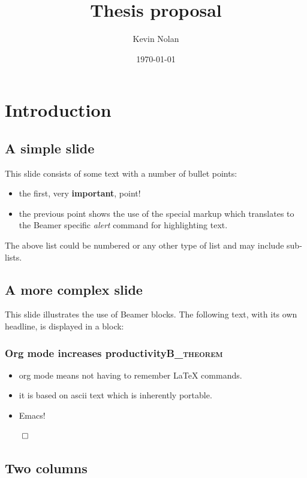 \documentclass[bigger]{beamer}
\author{Kevin Nolan}
\date{\today}
\title{Thesis proposal}
\begin{document}
\maketitle
\tableofcontents



\section{Introduction}
\label{sec:org74a5974}
\subsection{A simple slide}
\label{sec:orga8d710e}
This slide consists of some text with a number of bullet points:

\begin{itemize}
\item the first, very \textbf{important}, point!
\item the previous point shows the use of the special markup which
translates to the Beamer specific \emph{alert} command for highlighting
text.
\end{itemize}


The above list could be numbered or any other type of list and may
include sub-lists.

\subsection{A more complex slide}
\label{sec:org3eb832f}
This slide illustrates the use of Beamer blocks.  The following text,
with its own headline, is displayed in a block:
\subsubsection{Org mode increases productivity\hfill{}\textsc{B\_theorem}}
\label{sec:org0d29f12}
\begin{itemize}
\item org mode means not having to remember \LaTeX{} commands.
\item it is based on ascii text which is inherently portable.
\item Emacs!
\end{itemize}

\hfill \(\qed\)

\subsection{Two columns}
\label{sec:orgb1d8017}
\end{document}
